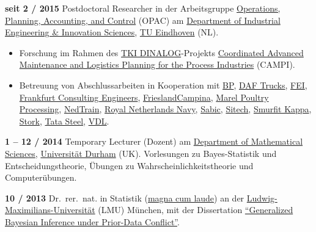 \documentclass[a4paper]{simplecv}
\begin{document}
\begin{topic}
\item[\hspace*{-2ex}\bfseries seit 2 / 2015] Postdoctoral Researcher
                  in der Arbeitsgruppe \href{http://opac.ieis.tue.nl/}{\glqq Operations, Planning, Accounting, and Control\grqq} (OPAC)
                  am \href{http://www.tue.nl/en/university/departments/industrial-engineering-innovation-sciences/}{Department of Industrial Engineering \& Innovation Sciences},
                  \href{http://www.tue.nl/en/}{TU Eindhoven} (NL).
\begin{itemize}
\item Forschung im Rahmen des \href{http://www.dinalog.nl/en/}{TKI DINALOG}-Projekts
\href{http://www.dinalog.nl/en/project/campi/}{\glqq Coordinated Advanced Maintenance and Logistics Planning for the Process Industries\grqq} (CAMPI).
\item Betreuung von Abschlussarbeiten in Kooperation mit
\href{http://www.bp.com/nl_nl/netherlands/over-bp/onze-raffinaderij.html}{BP},
\href{http://www.daf.com/EN}{DAF Trucks},
\href{http://www.fei.com/locations/fei-netherlands/}{FEI},
\href{http://frankfurt-consulting.de}{Frankfurt Consulting Engineers},
\href{http://www.frieslandcampina.com/en/}{FrieslandCampina},
\href{http://marel.com/poultry-processing}{Marel Poultry Processing},
\href{http://www.nedtrain.nl/}{NedTrain},
\href{http://www.defensie.nl/english/organisation/navy}{Royal Netherlands Navy},
\href{http://www.sabic.com}{Sabic},
\href{http://www.sitech.nl/en}{Sitech},
\href{http://www.smurfitkappa.com/vHome/nl/Roermond}{Smurfit Kappa},
\href{http://www.stork.com/en}{Stork},
\href{http://www.tatasteel.nl}{Tata Steel},
\href{http://www.vdlindustrialmodules.nl}{VDL}.
\end{itemize}

\item[\hspace*{-2ex}\bfseries 1 -- 12 / 2014] Temporary Lecturer (Dozent)
                  am \href{http://www.dur.ac.uk/mathematical.sciences/}{Department of Mathematical Sciences},
                  \href{http://www.durham.ac.uk}{Universität Durham} (UK).
                  Vorlesungen zu Bayes-Statistik und Entscheidungstheorie,
                  Übungen zu Wahrscheinlichkeitstheorie und Computerübungen. 

\item[\hspace*{-2ex}\bfseries 10 / 2013] Dr.\ rer.\ nat. in Statistik
                  (\href{http://www.geeeero/files/drrernat-de.pdf}{magna cum laude}) an der
                  \href{http://www.lmu.de}{Lud\-wig-Maximi\-li\-ans-Uni\-ver\-si\-tät} (LMU) München,
                  mit der Dissertation \href{https://edoc.ub.uni-muenchen.de/17059/}{``Generalized Bayesian Inference under Prior-Data Conflict''}.



\end{topic}
\end{document}
